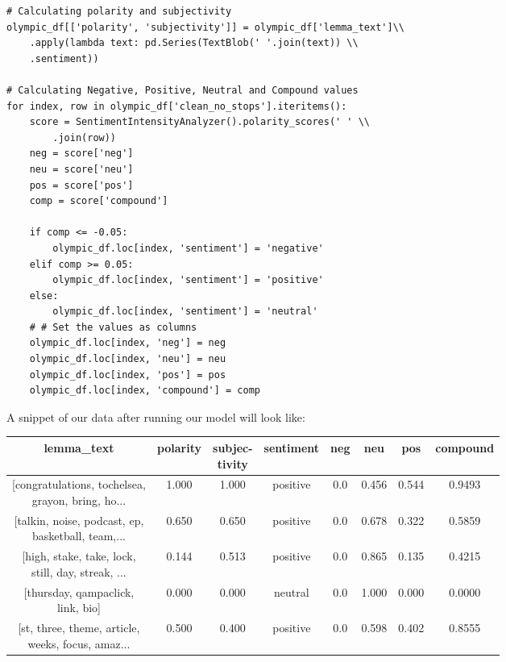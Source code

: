 \documentclass[12pt]{article}
\begin{document}
        \begin{lstlisting}[caption=Authorization]
# Calculating polarity and subjectivity
olympic_df[['polarity', 'subjectivity']] = olympic_df['lemma_text']\\
    .apply(lambda text: pd.Series(TextBlob(' '.join(text)) \\
    .sentiment))

# Calculating Negative, Positive, Neutral and Compound values
for index, row in olympic_df['clean_no_stops'].iteritems():
    score = SentimentIntensityAnalyzer().polarity_scores(' ' \\
        .join(row))
    neg = score['neg']
    neu = score['neu']
    pos = score['pos']
    comp = score['compound']

    if comp <= -0.05:
        olympic_df.loc[index, 'sentiment'] = 'negative'
    elif comp >= 0.05:
        olympic_df.loc[index, 'sentiment'] = 'positive'
    else:
        olympic_df.loc[index, 'sentiment'] = 'neutral'
    # # Set the values as columns
    olympic_df.loc[index, 'neg'] = neg
    olympic_df.loc[index, 'neu'] = neu
    olympic_df.loc[index, 'pos'] = pos
    olympic_df.loc[index, 'compound'] = comp
        \end{lstlisting}

    \noindent A snippet of our data after running our model will look like:

    \begin{center}
        \begin{tabular}{|c|c|c|c|c|c|c|c|}
            \hline
            lemma\_text & polarity & \makecell{subjec- \\tivity} & sentiment & neg & neu & pos & compound\\
            \hline
            \makecell{[congratulations, tochelsea, \\ grayon, bring, ho...} & 1.000 & 1.000 & positive & 0.0 & 0.456 & 0.544 & 0.9493\\
            \hline
            \makecell{[talkin, noise, podcast, ep, \\ basketball, team,...} & 0.650 & 0.650 & positive & 0.0 & 0.678 & 0.322 & 0.5859\\
            \hline
            \makecell{[high, stake, take, lock, \\ still, day, streak, ...} & 0.144 & 0.513 & positive & 0.0 & 0.865 & 0.135 & 0.4215\\
            \hline
            \makecell{[thursday, qampaclick, \\ link, bio]} & 0.000 & 0.000 & neutral & 0.0 & 1.000 & 0.000 & 0.0000\\
            \hline
            \makecell{[st, three, theme, article, \\ weeks, focus, amaz...} & 0.500 & 0.400 & positive & 0.0 & 0.598 & 0.402 & 0.8555\\
            \hline
        \end{tabular}
    \end{center}
\end{document}
